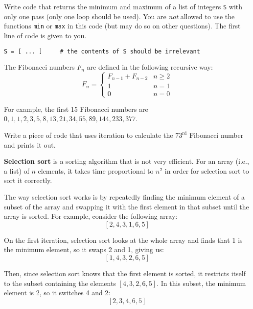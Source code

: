 \documentclass[addpoints]{exam}
\begin{document}
\begin{questions}
\begin{parts}

\end{parts}

\newpage

\question[10] Write code that returns the minimum and maximum of a list of integers \verb+S+ with only one pass (only one loop should be used). You are \emph{not} allowed to use the functions \texttt{min} or \texttt{max} in this code (but may do so on other questions). The first line of code is given to you.

\begin{verbatim}
S = [ ... ]     # the contents of S should be irrelevant
\end{verbatim}


\question[15] The Fibonacci numbers $F_n$ are defined in the following recursive way: $$F_n = \begin{cases} F_{n-1} + F_{n-2} & n \geq 2 \\ 1 & n = 1 \\ 0 & n = 0 \end{cases}$$

For example, the first 15 Fibonacci numbers are $0, 1, 1, 2, 3, 5, 8, 13, 21, 34, 55, 89, 144, 233, 377$.

Write a piece of code that uses iteration to calculate the $73^\text{rd}$ Fibonacci number and prints it out.


\newpage

\question[20] \textbf{Selection sort} is a sorting algorithm that is not very efficient. For an array (i.e., a list) of $n$ elements, it takes time proportional to $n^2$ in order for selection sort to sort it correctly.

The way selection sort works is by repeatedly finding the minimum element of a subset of the array and swapping it with the first element in that subset until the array is sorted. For example, consider the following array: $$[2, 4, 3, 1, 6, 5]$$

On the first iteration, selection sort looks at the whole array and finds that 1 is the minimum element, so it swaps 2 and 1, giving us: $$[1, 4, 3, 2, 6, 5]$$

Then, since selection sort knows that the first element is sorted, it restricts itself to the subset containing the elements $[4, 3, 2, 6, 5]$. In this subset, the minimum element is 2, so it switches 4 and 2: $$[2, 3, 4, 6, 5]$$ 


\end{questions}
\end{document}
